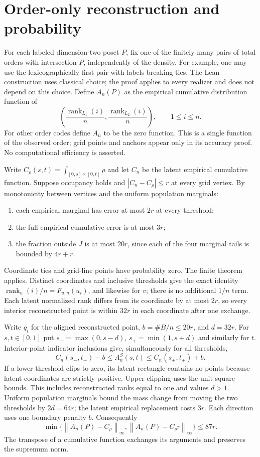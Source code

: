 \documentclass[11pt]{article}
\theoremstyle{remark}
\newcommand{\rank}{\operatorname{rank}}
\newcommand{\norm}[1]{\left\lVert #1\right\rVert_\infty}
\begin{document}
\section{Order-only reconstruction and probability}\label{sec:probability}
For each labeled dimension-two poset $P$, fix one of the finitely many
pairs of total orders with intersection $P$, independently of the density.
For example, one may use the lexicographically first pair with labels
breaking ties. The Lean construction uses classical choice; the proof
applies to every realizer and does not depend on this choice. Define $A_n(P)$ as the
empirical cumulative distribution function of
\[
 \left(\frac{\rank_{L_1}(i)}n,\frac{\rank_{L_2}(i)}n\right),\qquad1\le i\le n.
\]
For other order codes define $A_n$ to be the zero function. This is a single function
of the observed order; grid points and anchors appear only in its
accuracy proof. No computational efficiency is asserted.

Write $C_\rho(s,t)=\int_{[0,s]\times[0,t]}\rho$ and let $C_n$ be the
latent empirical cumulative function. Suppose occupancy holds and
$|C_n-C_\rho|\le r$ at every grid vertex. By monotonicity between
vertices and the uniform population marginals:
\begin{enumerate}
\item each empirical marginal has error at most $2r$ at every threshold;
\item the full empirical cumulative error is at most $3r$;
\item the fraction outside $J$ is at most $20r$, since each of the
four marginal tails is bounded by $4r+r$.
\end{enumerate}
Coordinate ties and grid-line points have probability zero.
The finite theorem applies. Distinct coordinates and inclusive thresholds
give the exact identity $\rank_u(i)/n=F_{u,n}(u_i)$, and likewise for $v$;
there is no additional $1/n$ term. Each latent normalized rank differs
from its coordinate by at most $2r$, so every interior reconstructed point
is within $32r$ in each coordinate after one exchange.

Write $q_i$ for the aligned reconstructed point, $b=\#B/n\le20r$,
and $d=32r$. For $s,t\in[0,1]$ put
$s_- =\max(0,s-d)$, $s_+=\min(1,s+d)$ and similarly for $t$.
Interior-point indicator inclusions give, simultaneously for all thresholds,
\[
 C_n(s_-,t_-)-b\le A_n^S(s,t)\le C_n(s_+,t_+)+b.
\]
If a lower threshold clips to zero, its latent rectangle contains no
points because latent coordinates are strictly positive. Upper clipping
uses the unit-square bounds. This includes reconstructed ranks equal
to one and values $d>1$. Uniform population marginals bound the mass
change from moving the two thresholds by $2d=64r$; the latent empirical
replacement costs $3r$. Each direction uses one boundary penalty $b$.
Consequently
\begin{equation}\label{eq:reconstruction}
 \min\{\norm{A_n(P)-C_\rho},\norm{A_n(P)-C_{\rho^T}}\}\le87r.
\end{equation}
The transpose of a cumulative function exchanges its arguments and
preserves the supremum norm.
\end{document}
